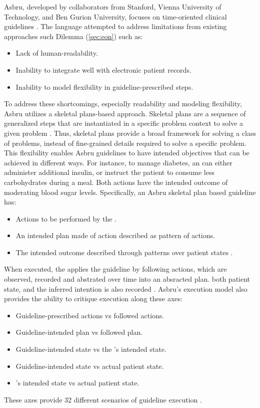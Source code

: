 Asbru, developed by collaborators from Stanford, Vienna
University of Technology, and Ben Gurion University, focuses on
time-oriented clinical guidelines \cite{ClerqAIM03}.
The language attempted to address limitations from existing approaches
such Dilemma (\autoref{sec:eon})
such as:
\begin{itemize}
  \item Lack of human-readability.
  \item Inability to integrate well with electronic patient records.
  \item Inability to model flexibility in guideline-prescribed steps.
\end{itemize}

To address these shortcomings, especially readability and modeling
flexibility, Asbru utilizes a skeletal plans-based approach.
Skeletal plans are a sequence of generalized steps that are instantiated
in a specific problem context to solve a given problem \cite{FriedlandJAR85}.
Thus, skeletal plans provide a broad framework for solving a class of problems,
instead of fine-grained details required to solve a specific problem.
This flexibility enables Asbru guidelines to have intended objectives that
can be achieved in different ways. For instance, to manage diabetes,
an \HCP{} can either administer additional insulin, or instruct
the patient to consume less carbohydrates during a meal. Both actions
have the intended outcome of moderating blood sugar levels.
Specifically, an Asbru skeletal plan based guideline has:
\begin{itemize}
  \item Actions to be performed by the \HCP{}.
  \item An intended plan made of action described as pattern of actions.
  \item The intended outcome described through patterns over patient states \cite{ShaharAIM98}.
\end{itemize}

When executed, the \HCP{} applies the guideline by following actions,
which are observed, recorded and abstrated over time into an absracted plan.
both patient state, and the inferred intention is also recorded
\cite{ShaharAIM98}. Asbru's execution model also provides the ability
to critique execution along these axes:
\begin{itemize}
  \item Guideline-prescribed actions vs \HCP{} followed actions.
  \item Guideline-intended plan vs \HCP{} followed plan.
  \item Guideline-intended state vs the \HCP{}'s intended state.
  \item Guideline-intended state vs actual patient state.
  \item \HCPs{}'s intended state vs actual patient state.
\end{itemize}
These axes provide 32 different scenarios of guideline execution
\cite{ShaharAIM98}.

